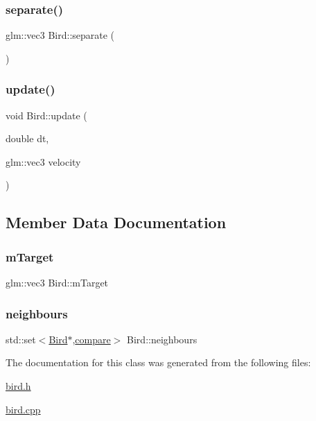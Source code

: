 \subsubsection{\texorpdfstring{separate()}{separate()}}
{\footnotesize\ttfamily glm\+::vec3 Bird\+::separate (\begin{DoxyParamCaption}{ }\end{DoxyParamCaption})}

\mbox{\label{classBird_a3ff2e32d861a71e89c1294e0e19e91de}} 
\subsubsection{\texorpdfstring{update()}{update()}}
{\footnotesize\ttfamily void Bird\+::update (\begin{DoxyParamCaption}\item[{double}]{dt,  }\item[{glm\+::vec3}]{velocity }\end{DoxyParamCaption})}



\subsection{Member Data Documentation}
\mbox{\label{classBird_a752294b0f405f7efec1eb0c135ab236b}} 
\subsubsection{\texorpdfstring{m\+Target}{mTarget}}
{\footnotesize\ttfamily glm\+::vec3 Bird\+::m\+Target}

\mbox{\label{classBird_a30992001074a4c312bfdb40a745dc3f8}} 
\subsubsection{\texorpdfstring{neighbours}{neighbours}}
{\footnotesize\ttfamily std\+::set$<$\hyperlink{classBird}{Bird}$\ast$,\hyperlink{structBird_1_1compare}{compare}$>$ Bird\+::neighbours}



The documentation for this class was generated from the following files\+:\begin{DoxyCompactItemize}
\item 
\hyperlink{bird_8h}{bird.\+h}\item 
\hyperlink{bird_8cpp}{bird.\+cpp}\end{DoxyCompactItemize}
